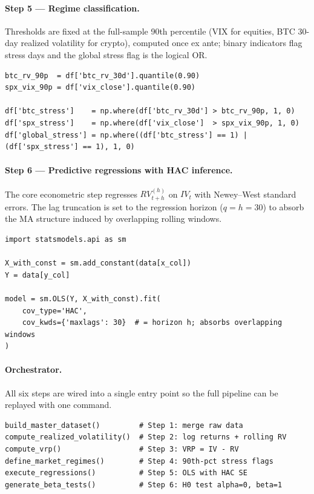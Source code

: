 \documentclass[11pt,a4paper,openany]{report}
\begin{document}
\paragraph{Step 5 --- Regime classification.} Thresholds are fixed at
the full-sample 90th percentile (VIX for equities, BTC 30-day realized
volatility for crypto), computed once ex ante; binary indicators flag
stress days and the global stress flag is the logical OR.

\begin{lstlisting}[caption={Stress regime indicators (\texttt{src/processing/regimes.py})}]
btc_rv_90p  = df['btc_rv_30d'].quantile(0.90)
spx_vix_90p = df['vix_close'].quantile(0.90)

df['btc_stress']    = np.where(df['btc_rv_30d'] > btc_rv_90p, 1, 0)
df['spx_stress']    = np.where(df['vix_close']  > spx_vix_90p, 1, 0)
df['global_stress'] = np.where((df['btc_stress'] == 1) | (df['spx_stress'] == 1), 1, 0)
\end{lstlisting}

\paragraph{Step 6 --- Predictive regressions with HAC inference.} The
core econometric step regresses $RV^{(h)}_{t+h}$ on $IV_t$ with
Newey--West standard errors. The lag truncation is set to the regression
horizon ($q = h = 30$) to absorb the MA structure induced by
overlapping rolling windows.

\begin{lstlisting}[caption={OLS with Newey--West HAC standard errors (\texttt{src/analysis/regressions.py})}]
import statsmodels.api as sm

X_with_const = sm.add_constant(data[x_col])
Y = data[y_col]

model = sm.OLS(Y, X_with_const).fit(
    cov_type='HAC',
    cov_kwds={'maxlags': 30}  # = horizon h; absorbs overlapping windows
)
\end{lstlisting}

\paragraph{Orchestrator.} All six steps are wired into a single entry
point so the full pipeline can be replayed with one command.

\begin{lstlisting}[caption={Pipeline orchestrator (\texttt{src/processing/run\_all\_processing.py})}]
build_master_dataset()         # Step 1: merge raw data
compute_realized_volatility()  # Step 2: log returns + rolling RV
compute_vrp()                  # Step 3: VRP = IV - RV
define_market_regimes()        # Step 4: 90th-pct stress flags
execute_regressions()          # Step 5: OLS with HAC SE
generate_beta_tests()          # Step 6: H0 test alpha=0, beta=1
\end{lstlisting}
\end{document}
